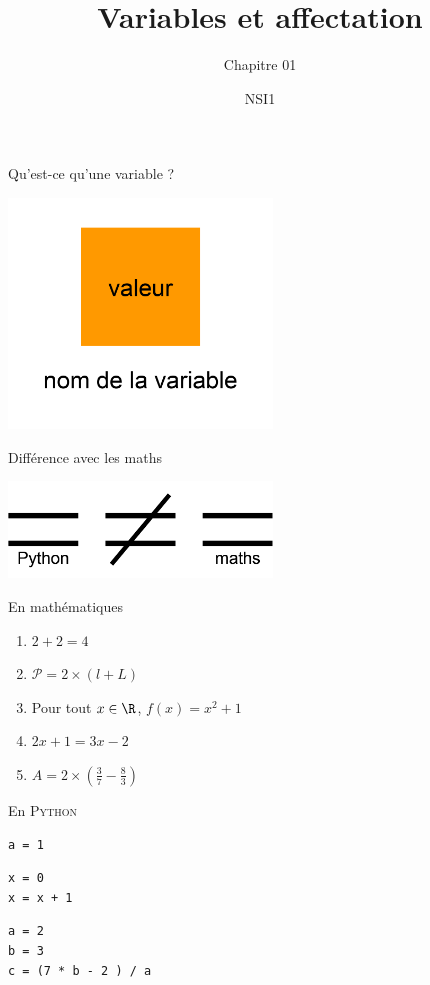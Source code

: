 \documentclass[10pt]{beamer}
\subtitle{Chapitre 01}
\title{Variables et affectation}
\author{NSI1}
\begin{document}
\maketitle
\begin{frame}{Qu'est-ce qu'une variable ?}\pause
\begin{center}
\includegraphics[width=7cm]{img/variable}
\end{center}
\end{frame}

\begin{frame}{Différence avec les maths}\pause
\begin{center}
\includegraphics[width=7cm]{img/different}
\end{center}
\end{frame}

\begin{frame}{En mathématiques}\pause
\huge
\begin{enumerate}[\textbullet]
	\item  $2+2=4$\pause
    \item  $\mathcal{P}=2\times(l+L)$\pause
    \item  Pour tout $x\in\R$, $f(x)=x^2+1$\pause
    \item  $2x+1=3x-2$\pause
    \item $A=2\times (\frac{3}{7}-\frac{8}{3})$
\end{enumerate}
\end{frame}

\begin{frame}[fragile]{En \textsc{Python}}\pause
\begin{verbatim}
a = 1
\end{verbatim}
\pause

\begin{verbatim}
x = 0
x = x + 1
\end{verbatim}
\pause

\begin{verbatim}
a = 2
b = 3
c = (7 * b - 2 ) / a
\end{verbatim}

\end{frame}
\end{document}
